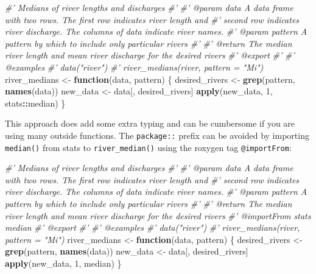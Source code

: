 \documentclass[
]{book}
\newenvironment{Shaded}{\begin{snugshade}}{\end{snugshade}}
\newcommand{\CommentTok}[1]{\textcolor[rgb]{0.56,0.35,0.01}{\textit{#1}}}
\newcommand{\ControlFlowTok}[1]{\textcolor[rgb]{0.13,0.29,0.53}{\textbf{#1}}}
\newcommand{\DecValTok}[1]{\textcolor[rgb]{0.00,0.00,0.81}{#1}}
\newcommand{\KeywordTok}[1]{\textcolor[rgb]{0.13,0.29,0.53}{\textbf{#1}}}
\newcommand{\NormalTok}[1]{#1}
\newcommand{\OperatorTok}[1]{\textcolor[rgb]{0.81,0.36,0.00}{\textbf{#1}}}
\newcommand{\StringTok}[1]{\textcolor[rgb]{0.31,0.60,0.02}{#1}}
\begin{document}
\begin{Shaded}
\begin{Highlighting}[]
\CommentTok{#' Medians of river lengths and discharges}
\CommentTok{#'}
\CommentTok{#' @param data A data frame with two rows. The first row indicates river length and}
\CommentTok{#'   second row indicates river discharge. The columns of data indicate river names.}
\CommentTok{#' @param pattern A pattern by which to include only particular rivers}
\CommentTok{#'}
\CommentTok{#' @return The median river length and mean river discharge for the desired rivers}
\CommentTok{#' @export}
\CommentTok{#'}
\CommentTok{#' @examples}
\CommentTok{#' data("river")}
\CommentTok{#' river_medians(river, pattern = "Mi")}
\NormalTok{river_medians <-}\StringTok{ }\ControlFlowTok{function}\NormalTok{(data, pattern) \{}
\NormalTok{  desired_rivers <-}\StringTok{ }\KeywordTok{grep}\NormalTok{(pattern, }\KeywordTok{names}\NormalTok{(data))}
\NormalTok{  new_data <-}\StringTok{ }\NormalTok{data[, desired_rivers]}
  \KeywordTok{apply}\NormalTok{(new_data, }\DecValTok{1}\NormalTok{, stats}\OperatorTok{::}\NormalTok{median)}
\NormalTok{\}}
\end{Highlighting}
\end{Shaded}

This approach does add some extra typing and can be cumbersome if you are using many outside functions. The \texttt{package::} prefix can be avoided by importing \texttt{median()} from stats to \texttt{river\_median()} using the roxygen tag \texttt{@importFrom}:

\begin{Shaded}
\begin{Highlighting}[]
\CommentTok{#' Medians of river lengths and discharges}
\CommentTok{#'}
\CommentTok{#' @param data A data frame with two rows. The first row indicates river length and}
\CommentTok{#'   second row indicates river discharge. The columns of data indicate river names.}
\CommentTok{#' @param pattern A pattern by which to include only particular rivers}
\CommentTok{#'}
\CommentTok{#' @return The median river length and mean river discharge for the desired rivers}
\CommentTok{#' @importFrom stats median}
\CommentTok{#' @export}
\CommentTok{#'}
\CommentTok{#' @examples}
\CommentTok{#' data("river")}
\CommentTok{#' river_medians(river, pattern = "Mi")}
\NormalTok{river_medians <-}\StringTok{ }\ControlFlowTok{function}\NormalTok{(data, pattern) \{}
\NormalTok{  desired_rivers <-}\StringTok{ }\KeywordTok{grep}\NormalTok{(pattern, }\KeywordTok{names}\NormalTok{(data))}
\NormalTok{  new_data <-}\StringTok{ }\NormalTok{data[, desired_rivers]}
  \KeywordTok{apply}\NormalTok{(new_data, }\DecValTok{1}\NormalTok{, median)}
\NormalTok{\}}
\end{Highlighting}
\end{Shaded}
\end{document}
